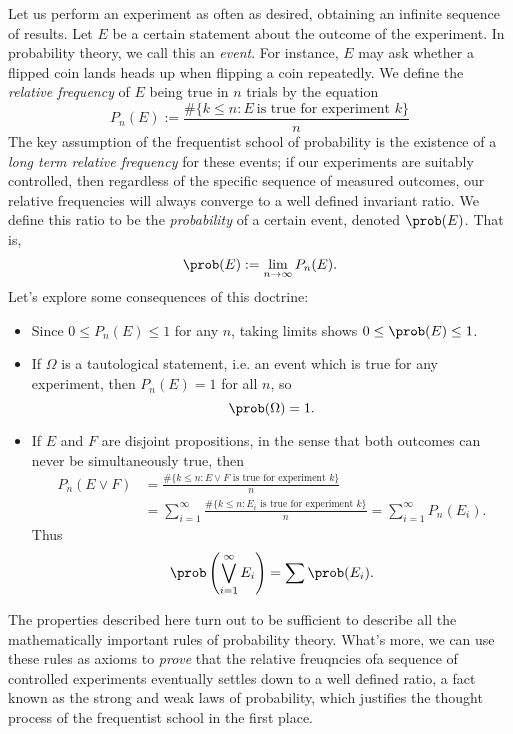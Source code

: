 Let us perform an experiment as often as desired, obtaining an infinite sequence of results. Let $E$ be a certain statement about the outcome of the experiment. In probability theory, we call this an \emph{event}. For instance, $E$ may ask whether a flipped coin lands heads up when flipping a coin repeatedly. We define the \emph{relative frequency} of $E$ being true in $n$ trials by the equation
%
\[ P_n(E) := \frac{\# \{ k \leq n : E\ \text{is true for experiment $k$} \}}{n} \]
%
The key assumption of the frequentist school of probability is the existence of a {\it long term relative frequency} for these events; if our experiments are suitably controlled, then regardless of the specific sequence of measured outcomes, our relative frequencies will always converge to a well defined invariant ratio. We define this ratio to be the \emph{probability} of a certain event, denoted $\prob(E)$. That is,
%
\[ \prob(E) := \lim_{n \to \infty} P_n(E). \]
%
Let's explore some consequences of this doctrine:
%
\begin{itemize}
    \item Since $0 \leq P_n(E) \leq 1$ for any $n$, taking limits shows $0 \leq \prob(E) \leq 1$.

    \item If $\Omega$ is a tautological statement, i.e. an event which is true for any experiment, then $P_n(E) = 1$ for all $n$, so
    \[ \prob(\Omega) = 1. \]

    \item If $E$ and $F$ are disjoint propositions, in the sense that both outcomes can never be simultaneously true, then 
    \begin{align*}
        P_n \left( E \vee F \right) &= \frac{\# \{ k \leq n : \text{$E \vee F$ is true for experiment $k$} \}}{n}\\
        &= \sum_{i = 1}^\infty \frac{\# \{ k \leq n : \text{$E_i$ is true for experiment $k$} \}}{n} = \sum_{i = 1}^\infty P_n(E_i).
    \end{align*}
    Thus
    \[ \prob \left( \bigvee_{i = 1}^\infty E_i \right) = \sum \prob(E_i). \]
\end{itemize}
%
The properties described here turn out to be sufficient to describe all the mathematically important rules of probability theory. What's more, we can use these rules as axioms to {\it prove} that the relative freuqncies ofa sequence of controlled experiments eventually settles down to a well defined ratio, a fact known as the strong and weak laws of probability, which justifies the thought process of the frequentist school in the first place.


